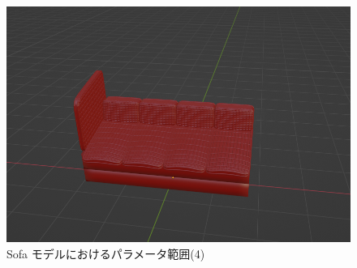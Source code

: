 \begin{figure}[h]
\begin{minipage}[b]{0.48\linewidth}
  \includegraphics[scale=0.17]{./imgs/sofaParamMean/cushinoNosingMax.png}
 \end{minipage}
 \caption{Sofa モデルにおけるパラメータ範囲(4)}\label{fig:sofaParamMean_4}
\end{figure}


